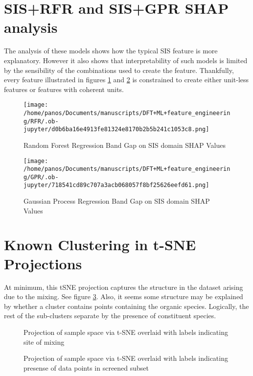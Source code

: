 \clearpage

\section*{SIS+RFR and SIS+GPR SHAP analysis}
\label{sec:org011016d}
The analysis of these models shows how the typical SIS feature is more explanatory.
However it also shows that interpretability of such models is limited by the sensibility of the combinations used to create the feature.
Thankfully, every feature illustrated in figures \ref{fig:rfrSHAPe} and \ref{fig:gprSHAPe} is constrained to create either unit-less features or features with coherent units.

\begin{figure}[htbp]
\centering
\texttt{[image: /home/panos/Documents/manuscripts/DFT+ML+feature\_engineering/RFR/.ob-jupyter/d0b6ba16e4913fe81324e8170b2b5b241c1053c8.png]}
\caption{\label{fig:rfrSHAPe} Random Forest Regression Band Gap on SIS domain SHAP Values}
\end{figure}

\begin{figure}[htbp]
\centering
\texttt{[image: /home/panos/Documents/manuscripts/DFT+ML+feature\_engineering/GPR/.ob-jupyter/718541cd89c707a3acb068057f8bf25626eefd61.png]}
\caption{\label{fig:gprSHAPe} Gaussian Process Regression Band Gap on SIS domain SHAP Values}
\end{figure}

\clearpage

\section*{Known Clustering in t-SNE Projections}
\label{sec:org9cb877b}
At minimum, this tSNE projection captures the structure in the dataset arising due to the mixing.
See figure \ref{fig:alloys}.
Also, it seems some structure may be explained by whether a cluster contains points containing the organic species.
Logically, the rest of the sub-clusters separate by the presence of constituent species.

 
\begin{figure}[htbp]
\centering

\caption{\label{fig:alloys} Projection of sample space via t-SNE overlaid with labels indicating site of mixing}
\end{figure}

 
\begin{figure}[htbp]
\centering

\caption{\label{fig:chosen} Projection of sample space via t-SNE overlaid with labels indicating presense of data points in screened subset}
\end{figure}

